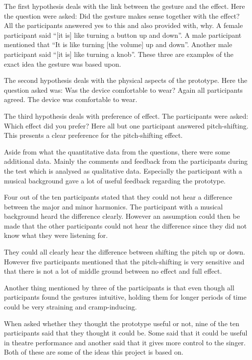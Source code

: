 The first hypothesis deals with the link between the gesture and the effect. Here the question were asked: Did the gesture makes sense together with the effect? All the participants answered yes to this and also provided with, why. A female participant said “[it is] like turning a button up and down”. A male participant mentioned that “It is like turning [the volume] up and down”. Another male participant said “[it is] like turning a knob”. These three are examples of the exact idea the gesture was based upon. 

The second hypothesis deals with the physical aspects of the prototype. Here the question asked was: Was the device comfortable to wear? Again all participants agreed. The device was comfortable to wear. 

The third hypothesis deals with preference of effect. The participants were asked: Which effect did you prefer? Here all but one participant answered pitch-shifting. This presents a clear preference for the pitch-shifting effect. 

Aside from what the quantitative data from the questions, there were some additional data. Mainly the comments and feedback from the participants during the test which is analysed as qualitative data. Especially the participant with a musical background gave a lot of useful feedback regarding the prototype. 

Four out of the ten participants stated that they could not hear a difference between the major and minor harmonics. The participant with a musical background heard the difference clearly. However an assumption could then be made that the other participants could not hear the difference since they did not know what they were listening for. 

They could all clearly hear the difference between shifting the pitch up or down. However five participants mentioned that the pitch-shifting is very sensitive and that there is not a lot of middle ground between no effect and full effect. 

Another thing mentioned by three of the participants is that even though all participants found the gestures intuitive, holding them for longer periods of time could be very straining and cramp-inducing. 

When asked whether they thought the prototype useful or not, nine of the ten participants said that they thought it could be. Some said that it could be useful in theatre performance and another said that it gives more control to the singer. Both of these are some of the ideas this project is based on. 

